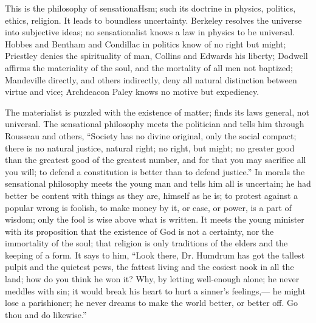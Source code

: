 \documentclass[12pt]{article}
\begin{document}

This is the philosophy of sensationaHsm; such its doctrine in physics, politics, ethics, religion. It leads to boundless uncertainty. Berkeley resolves the universe into subjective ideas; no sensationalist knows a law in physics to be universal. Hobbes and Bentham and Condillac in politics know of no right but might; Priestley denies the spirituality of man, Collins and Edwards his liberty; Dodwell affirms the materiality of the soul, and the mortality of all men not baptized; Mandeville directly, and others indirectly, deny all natural distinction between virtue and vice; Archdeacon Paley knows no motive but expediency. 

The materialist is puzzled with the existence of matter; finds its laws general, not universal. The sensational philosophy meets the politician and tells him through Rousseau and others, ``Society has no divine original, only the social compact; there is no natural justice, natural right; no right, but might; no greater good than the greatest good of the greatest number, and for that you may sacrifice all you will; to defend a constitution is better than to defend justice.'' In morals the sensational philosophy meets the young man and tells him all is uncertain; he had better be content with things as they are, himself as he is; to protest against a popular wrong is foolish, to make money by it, or ease, or power, is a part of wisdom; only the fool is wise above what is written. It meets the young minister with its proposition that the existence of God is not a certainty, nor the immortality of the soul; that religion is only traditions of the elders and the keeping of a form. It says to him, ``Look there, Dr. Humdrum has got the tallest pulpit and the quietest pews, the fattest living and the cosiest nook in all the land; how do you think he won it? Why, by letting well-enough alone; he never meddles with sin; it would break his heart to hurt a sinner's feelings,--- he might lose a parishioner; he never dreams to make the world better, or better off. Go thou and do likewise.'' 
\end{document}
